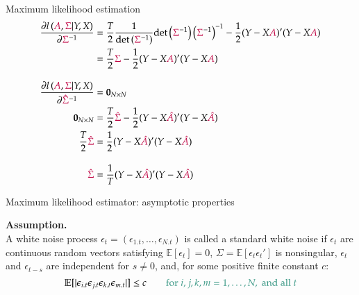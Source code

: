 \documentclass[notes,blackandwhite,mathsans,usenames,dvipsnames]{beamer}
\begin{document}
\begin{frame}{Maximum likelihood estimation}
\small
\begin{align*} 
\frac{\partial l\left( {\color{purple}A},{\color{purple}\Sigma}|Y,X \right)}{\partial {\color{purple}\Sigma}^{-1}} &= \frac{T}{2}\frac{1}{\text{det}\left({\color{purple}\Sigma}^{-1}\right)}\text{det}\left({\color{purple}\Sigma}^{-1}\right)\left({\color{purple}\Sigma}^{-1}\right)^{-1} - \frac{1}{2}(Y-X{\color{purple}A})'(Y-X{\color{purple}A})\\
&= \frac{T}{2}{\color{purple}\Sigma} - \frac{1}{2}(Y-X{\color{purple}A})'(Y-X{\color{purple}A}) \\[2ex]
\frac{\partial l\left( {\color{purple}A},{\color{purple}\Sigma}|Y,X \right)}{\partial {\color{purple}\hat\Sigma}^{-1}} &= \mathbf{0}_{N\times N}\\
\mathbf{0}_{N\times N} &= \frac{T}{2}{\color{purple}\hat\Sigma} - \frac{1}{2}(Y-X{\color{purple}\hat{A}})'(Y-X{\color{purple}\hat{A}})\\
\frac{T}{2}{\color{purple}\hat\Sigma} &= \frac{1}{2}(Y-X{\color{purple}\hat{A}})'(Y-X{\color{purple}\hat{A}})\\[2ex]
{\color{purple}\hat\Sigma} &= \frac{1}{T}(Y-X{\color{purple}\hat{A}})'(Y-X{\color{purple}\hat{A}})
\end{align*}

\end{frame}





\begin{frame}{Maximum likelihood estimator: asymptotic properties}

\textbf{Assumption.}\\
{\color{mcxs2}A white noise process} $\epsilon_t = (\epsilon_{1.t},\dots , \epsilon_{N.t})$ {\color{mcxs2}is called a} {\color{mcxs1}standard white noise} {\color{mcxs2}if} $\epsilon_t$ {\color{mcxs2}are continuous random vectors satisfying} $\mathbb{E}[\epsilon_t] = 0$, $\Sigma = \mathbb{E}[\epsilon_t \epsilon_t']$ {\color{mcxs2}is nonsingular,} $\epsilon_t$ {\color{mcxs2}and} $\epsilon_{t-s}$ {\color{mcxs2}are independent for} $s \neq 0$, {\color{mcxs2}and, for some positive finite constant} $c$:
$$ \mathbb{E}[|\epsilon_{i.t} \epsilon_{j.t} \epsilon_{k.t} \epsilon_{m.t}|] \leq c \qquad{\color{mcxs2}\text{for }i,j,k,m = 1,\dots,N, \text{ and all }t} $$

\small
{}
\end{frame}
\end{document}
